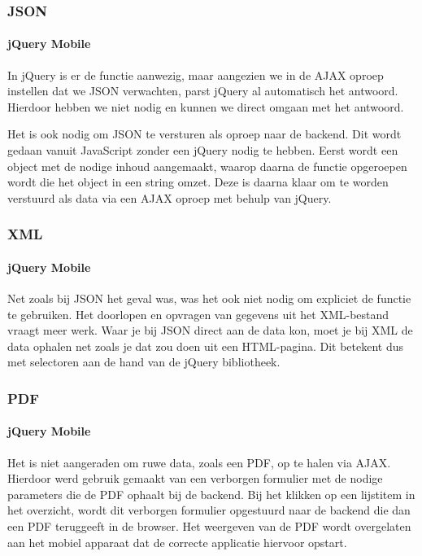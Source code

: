 \subsubsection{JSON}

\paragraph{jQuery Mobile} 
In jQuery is er de functie  aanwezig, maar aangezien we in de AJAX oproep instellen dat we JSON verwachten, parst jQuery al automatisch het antwoord. 
Hierdoor hebben we  niet nodig en kunnen we direct omgaan met het antwoord.

Het is ook nodig om JSON te versturen als oproep naar de backend. 
Dit wordt gedaan vanuit JavaScript zonder een jQuery nodig te hebben. 
Eerst wordt een object met de nodige inhoud aangemaakt, waarop daarna de functie  opgeroepen wordt die het object in een string omzet.
Deze is daarna klaar om te worden verstuurd als data via een AJAX oproep met behulp van jQuery.

\subsubsection{XML}

\paragraph{jQuery Mobile} 
Net zoals bij JSON het geval was, was het ook niet nodig om expliciet de  functie te gebruiken. Het doorlopen en opvragen van gegevens uit het XML-bestand vraagt meer werk. Waar je bij JSON direct aan de data kon, moet je bij XML de data ophalen net zoals je dat zou doen uit een HTML-pagina. Dit betekent dus met selectoren aan de hand van de jQuery bibliotheek.

\subsubsection{PDF}

\paragraph{jQuery Mobile} 
Het is niet aangeraden om ruwe data, zoals een PDF, op te halen via AJAX. 
Hierdoor werd gebruik gemaakt van een verborgen formulier met de nodige parameters die de PDF ophaalt bij de backend. 
Bij het klikken op een lijstitem in het overzicht, wordt dit verborgen formulier opgestuurd naar de backend die dan een PDF teruggeeft in de browser. 
Het weergeven van de PDF wordt overgelaten aan het mobiel apparaat dat de correcte applicatie hiervoor opstart.

